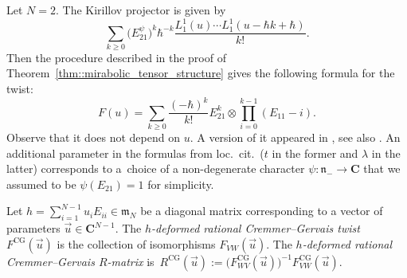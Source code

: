 \documentclass[10pt,a4paper]{article}
\numberwithin{equation}{section}
\newcommand{\CG}{\mathrm{CG}}
\newcommand{\C}{\mathbf{C}}
\newcommand{\n}{\mathfrak{n}}
\newcommand{\m}{\mathfrak{m}}
\begin{document}
	\begin{Example}
		Let $N=2$. The Kirillov projector is given by
		\[
		\sum\limits_{k\geq 0} \bigl(E_{21}^{\psi}\bigr)^k \hbar^{-k} \frac{L_1^1(u) \cdots L_1^1(u-\hbar k + \hbar)}{k!}.
		\]
		Then the procedure described in the proof of Theorem~\ref{thm::mirabolic_tensor_structure} gives the following formula for the twist:
		\begin{equation}
			\label{eq::cg_twist_gl2}
			F(u)= \sum\limits_{k\geq 0} \frac{(-\hbar)^k}{k!} E_{21}^k \otimes \prod_{i=0}^{k-1} (E_{11} - i).
		\end{equation}
		Observe that it does not depend on $u$. A version of it appeared in \cite{GerstenhaberGiaquintoSchack}, see also \cite{KhoroshkinStolinTolstoy}. An additional parameter in the formulas from loc.\ cit.\  ($t$ in the former and $\lambda$ in the latter) corresponds to a~choice of a non-degenerate character $\psi\colon \n_- \rightarrow \C$ that we assumed to be $\psi(E_{21})=1$ for simplicity.
	\end{Example}
	
	\begin{Definition}
		\label{def::cremmer_gervais}
		Let $h = \sum_{i=1}^{N-1} u_i E_{ii} \in \m_N$ be a diagonal matrix corresponding to a vector of parameters $\vec{u} \in \C^{N-1}$. The $h$\emph{-deformed rational Cremmer--Gervais twist} $F^{\CG}(\vec{u})$ is the collection of isomorphisms $F_{VW}(\vec{u})$. The $h$\emph{-deformed rational Cremmer--Gervais $R$-matrix} is~$R^{\CG}(\vec{u}):= \bigl(F_{WV}^{\CG}(\vec{u})\bigr)^{-1} F_{VW}^{\CG}(\vec{u})$.
	\end{Definition}
	
\end{document}
